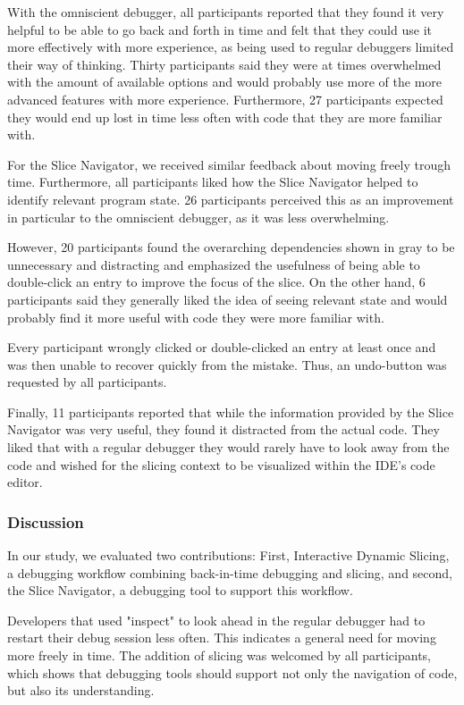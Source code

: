 \documentclass[
			english,
			review,
			]{elsarticle}
\begin{document}
With the omniscient debugger, all participants reported that they found it very helpful to be able to go back and forth in time and felt that they could use it more effectively with more experience, as being used to regular debuggers limited their way of thinking.
Thirty participants said they were at times overwhelmed with the amount of available options and would probably use more of the more advanced features with more experience.
Furthermore, 27 participants expected they would end up lost in time less often with code that they are more familiar with.

For the Slice Navigator, we received similar feedback about moving freely trough time.
Furthermore, all participants liked how the Slice Navigator helped to identify relevant program state.
26 participants perceived this as an improvement in particular to the omniscient debugger, as it was less overwhelming.

However, 20 participants found the overarching dependencies shown in gray to be unnecessary and distracting and emphasized the usefulness of being able to double-click an entry to improve the focus of the slice.
On the other hand, 6 participants said they generally liked the idea of seeing relevant state and would probably find it more useful with code they were more familiar with.

Every participant wrongly clicked or double-clicked an entry at least once and was then unable to recover quickly from the mistake.
Thus, an undo-button was requested by all participants.

Finally, 11 participants reported that while the information provided by the Slice Navigator was very useful, they found it distracted from the actual code.
They liked that with a regular debugger they would rarely have to look away from the code and wished for the slicing context to be visualized within the IDE's code editor.

\subsubsection{Discussion}

In our study, we evaluated two contributions: 
First, Interactive Dynamic Slicing, a debugging workflow combining back-in-time debugging and slicing, and second, the Slice Navigator, a debugging tool to support this workflow.

Developers that used "inspect" to look ahead in the regular debugger had to restart their debug session less often.
This indicates a general need for moving more freely in time.
The addition of slicing was welcomed by all participants, which shows that debugging tools should support not only the navigation of code, but also its understanding.
\end{document}
